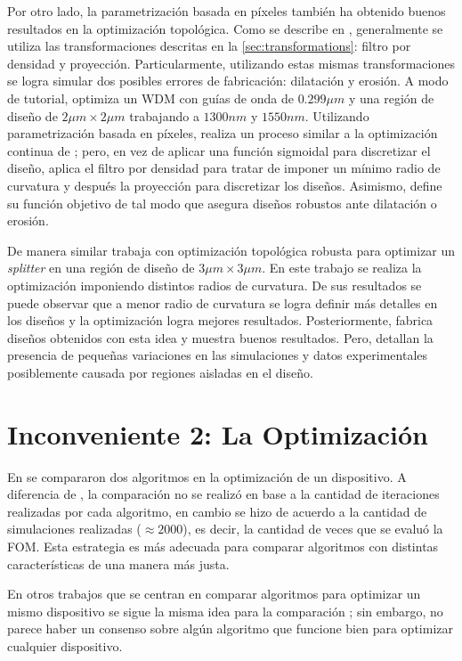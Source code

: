Por otro lado, la parametrización basada en píxeles también ha obtenido buenos resultados en
la optimización topológica.
Como se describe en \cite{Lazarov2016}, generalmente se utiliza las transformaciones 
descritas en la \autoref{sec:transformations}:
filtro por densidad y proyección. Particularmente, utilizando estas mismas transformaciones
se logra simular dos posibles errores de fabricación: dilatación y erosión.
A modo de tutorial, \cite{Christiansen2021} optimiza un WDM con guías de onda de $0.299 \mu m$ y
una región de diseño de $2 \mu m \times 2 \mu m$ trabajando a $1300 nm$ y $1550 nm$.
Utilizando parametrización basada en píxeles, 
realiza un proceso similar a la optimización continua de \cite{Su2020}; 
pero, en vez de aplicar una función sigmoidal para 
discretizar el diseño, aplica el filtro por densidad para tratar de imponer un mínimo radio de curvatura
y después la proyección para discretizar los diseños. 
Asimismo, define su función objetivo de tal modo que asegura
diseños robustos ante dilatación o erosión.

De manera similar \cite{Hammond20} trabaja con optimización topológica robusta para optimizar un 
\emph{splitter} en una región de diseño de $3 \mu m \times 3 \mu m$.
En este trabajo se realiza la optimización imponiendo distintos radios de curvatura.
De sus resultados se puede observar que a menor radio de curvatura se logra definir más detalles en los
diseños y la optimización logra mejores resultados.
Posteriormente, \cite{Hammond21} fabrica diseños obtenidos con esta idea y muestra buenos resultados. 
Pero, detallan la presencia de pequeñas variaciones en las simulaciones y datos experimentales
posiblemente causada por regiones aisladas en el diseño.

\section{Inconveniente 2: La Optimización}

En \cite{Malheiros-Silveira2020} se compararon dos algoritmos en la optimización de un dispositivo.
A diferencia de \cite{Prosopio-Galarza2019}, la comparación no se realizó en base a la cantidad de iteraciones
realizadas por cada algoritmo, en cambio se hizo de acuerdo a la cantidad de simulaciones realizadas 
($\approx 2000$), es decir, la cantidad de veces que se evaluó la FOM.
Esta estrategia es más adecuada para comparar algoritmos con distintas características de una manera más justa.


En otros trabajos que se centran en comparar algoritmos para optimizar un mismo dispositivo se sigue la misma
idea para la comparación \citep{Schneider2019, Gregory2015}; sin embargo, no parece haber un consenso sobre algún algoritmo que funcione bien
para optimizar cualquier dispositivo.


